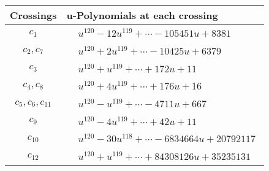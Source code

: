 \documentclass[1p]{elsarticle_modified}
\theoremstyle{definition}
\begin{document}
\begin{tabular}{m{50pt}|m{274pt}}
Crossings & \hspace{64pt}u-Polynomials at each crossing \\
\hline $$\begin{aligned}c_{1}\end{aligned}$$&$\begin{aligned}
&u^{120}-12 u^{119}+\cdots-105451 u+8381
\end{aligned}$\\
\hline $$\begin{aligned}c_{2},c_{7}\end{aligned}$$&$\begin{aligned}
&u^{120}+2 u^{119}+\cdots-10425 u+6379
\end{aligned}$\\
\hline $$\begin{aligned}c_{3}\end{aligned}$$&$\begin{aligned}
&u^{120}+u^{119}+\cdots+172 u+11
\end{aligned}$\\
\hline $$\begin{aligned}c_{4},c_{8}\end{aligned}$$&$\begin{aligned}
&u^{120}+4 u^{119}+\cdots+176 u+16
\end{aligned}$\\
\hline $$\begin{aligned}c_{5},c_{6},c_{11}\end{aligned}$$&$\begin{aligned}
&u^{120}- u^{119}+\cdots-4711 u+667
\end{aligned}$\\
\hline $$\begin{aligned}c_{9}\end{aligned}$$&$\begin{aligned}
&u^{120}-4 u^{119}+\cdots+42 u+11
\end{aligned}$\\
\hline $$\begin{aligned}c_{10}\end{aligned}$$&$\begin{aligned}
&u^{120}-30 u^{118}+\cdots-6834664 u+20792117
\end{aligned}$\\
\hline $$\begin{aligned}c_{12}\end{aligned}$$&$\begin{aligned}
&u^{120}+u^{119}+\cdots+84308126 u+35235131
\end{aligned}$\\
\hline
\end{tabular}\\~\\
\end{document}
